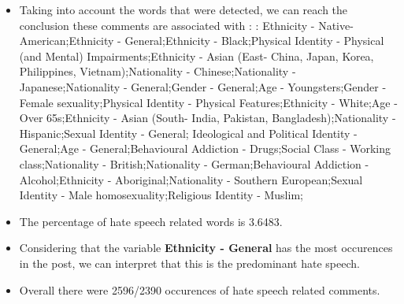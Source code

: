 \documentclass[11pt]{article}
\begin{document}
\begin{itemize}\item Taking into account the words that were detected, we can reach the conclusion these comments are associated with : : Ethnicity - Native-American;Ethnicity - General;Ethnicity - Black;Physical Identity - Physical (and Mental) Impairments;Ethnicity - Asian (East- China, Japan, Korea, Philippines, Vietnam);Nationality - Chinese;Nationality - Japanese;Nationality - General;Gender - General;Age - Youngsters;Gender - Female sexuality;Physical Identity - Physical Features;Ethnicity - White;Age - Over 65s;Ethnicity - Asian (South- India, Pakistan, Bangladesh);Nationality - Hispanic;Sexual Identity - General; Ideological and Political Identity - General;Age - General;Behavioural Addiction - Drugs;Social Class - Working class;Nationality - British;Nationality - German;Behavioural Addiction - Alcohol;Ethnicity - Aboriginal;Nationality - Southern European;Sexual Identity - Male homosexuality;Religious Identity - Muslim;%

\item The percentage of hate speech related words is 3.6483.

\item Considering that the variable \textbf{Ethnicity - General} has the most occurences in the post, we can interpret that this is the predominant hate speech.

\item Overall there were 2596/2390 occurences of hate speech related comments.\end{itemize}
\end{document}
